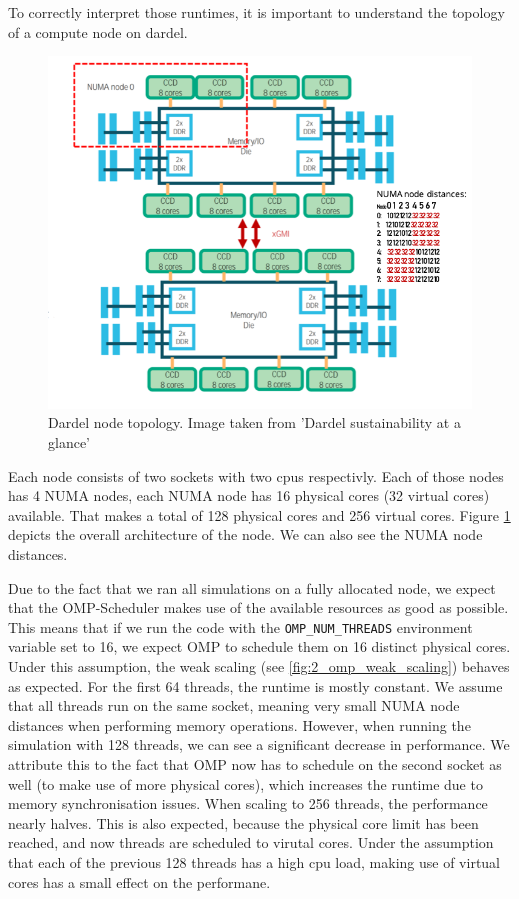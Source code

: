 \documentclass[a4paper,10pt]{article}
\begin{document}
To correctly interpret those runtimes, it is important to understand the topology of a compute node on dardel.
\begin{figure}
     \centering
     \includegraphics[width=\textwidth]{../images/2_openmp/node_topology.png}
     \caption{Dardel node topology. Image taken from 'Dardel sustainability at a glance'\cite{Barth2023}}
     \label{fig:dardel_topo}
\end{figure}
Each node consists of two sockets with two cpus respectivly.
Each of those nodes has 4 NUMA nodes, each NUMA node has 16 physical cores (32 virtual cores) available.
That makes a total of 128 physical cores and 256 virtual cores.
Figure \ref{fig:dardel_topo} depicts the overall architecture of the node.
We can also see the NUMA node distances.

Due to the fact that we ran all simulations on a fully allocated node, we expect that the OMP-Scheduler makes use of the available resources as good as possible.
This means that if we run the code with the \verb|OMP_NUM_THREADS| environment variable set to 16, we expect OMP to schedule them on 16 distinct physical cores.
Under this assumption, the weak scaling (see \ref{fig:2_omp_weak_scaling}) behaves as expected.
For the first 64 threads, the runtime is mostly constant.
We assume that all threads run on the same socket, meaning very small NUMA node distances when performing memory operations.
However, when running the simulation with 128 threads, we can see a significant decrease in performance.
We attribute this to the fact that OMP now has to schedule on the second socket as well (to make use of more physical cores), which increases the runtime due to memory synchronisation issues.
When scaling to 256 threads, the performance nearly halves.
This is also expected, because the physical core limit has been reached, and now threads are scheduled to virutal cores.
Under the assumption that each of the previous 128 threads has a high cpu load, making use of virtual cores has a small effect on the performane.
\end{document}
